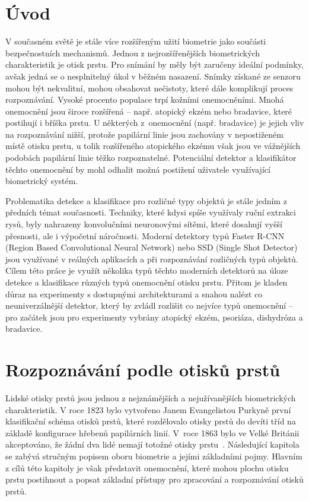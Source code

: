 
\chapter{Úvod}
V současném světě je stále více rozšířeným užití biometrie jako součásti bezpečnostních mechanismů. Jednou z nejrozšířenějších biometrických charakteristik je otisk prstu. Pro snímání by měly být zaručeny ideální podmínky, avšak jedná se o nesplnitelný úkol v běžném nasazení. Snímky získané ze senzoru mohou být nekvalitní, mohou obsahovat nečistoty, které dále komplikují proces rozpoznávání. Vysoké procento populace trpí kožními onemocněními. Mnohá onemocnění jsou široce rozšířená -- např. atopický ekzém nebo bradavice, které postihují i bříška prstu. U některých z~onemocnění (např. bradavice) je jejich vliv na rozpoznávání nižší, protože papilární linie jsou zachovány v nepostiženém místě otisku prstu, u tolik rozšířeného atopického ekzému však jsou ve vážnějších podobách papilární linie těžko rozpoznatelné. Potenciální detektor a klasifikátor těchto onemocnění by mohl odhalit možná postižení uživatele využívající biometrický systém.

Problematika detekce a klasifikace pro rozličné typy objektů je stále jedním z předních témat současnosti. Techniky, které kdysi spíše využívaly ruční extrakci rysů, byly nahrazeny konvolučními neuronovými sítěmi, které dosahují vyšší přesnosti, ale i výpočetní náročnosti. Moderní detektory typů Faster R-CNN (Region Based Convolutional Neural Network) nebo SSD (Single Shot Detector) jsou využívané v reálných aplikacích a při rozpoznávání rozličných typů objektů. Cílem této práce je využít několika typů těchto moderních detektorů na úloze detekce a klasifikace různých typů onemocnění otisku prstu. Přitom je kladen důraz na experimenty s dostupnými architekturami a snahou nalézt co neuniverzálnější detektor, který by zvládl rozlišit co nejvíce typů onemocnění -- pro začátek jsou pro experimenty vybrány atopický ekzém, psoriáza, dishydróza a bradavice.
\chapter{Rozpoznávání podle otisků prstů}
Lidské otisky prstů jsou jednou z nejznámějších a nejužívanějších biometrických charakteristik. V roce 1823 bylo vytvořeno Janem Evangelistou Purkyně první klasifikační schéma otisků prstů, které rozdělovalo otisky prstů do devíti tříd na základě konfigurace hřebenů papilárních linií. V~roce 1863 bylo ve Velké Británii akceptováno, že žádní dva lidé nemají totožné otisky prstu~\cite{Maltoni2009}. Následující kapitola se zabývá stručným popisem oboru biometrie a jejími základními pojmy. Hlavním z cílů této kapitoly je však představit onemocnění, které mohou plochu otisku prstu postihnout a popsat základní přístupy pro zpracování a rozpoznávání otisků prstů.

